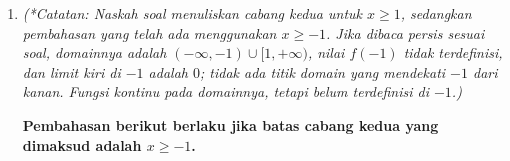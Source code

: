 \documentclass[10pt,openany,a4paper]{article}
\begin{document}
\begin{enumerate}
\begin{enumerate}
            Karena range $R_{f^{-1}}=D_f=(-\infty,1]$, maka $f^{-1}(x)=1-\sqrt{x}$.\\~\\

            \item Salah satu cara menggambar grafik $f^{-1}(x)$ adalah dengan mencerminkan $f(x)$ terhadap garis $y=x$, sehingga akan didapat grafik $f^{-1}(x)$.\\
            \\
            \end{enumerate}
            
            \item \textit{(*Catatan: Naskah soal menuliskan cabang kedua untuk $x\geq1$, sedangkan pembahasan yang telah ada menggunakan $x\geq-1$. Jika dibaca persis sesuai soal, domainnya adalah $(-\infty,-1)\cup[1,+\infty)$, nilai $f(-1)$ tidak terdefinisi, dan limit kiri di $-1$ adalah $0$; tidak ada titik domain yang mendekati $-1$ dari kanan. Fungsi kontinu pada domainnya, tetapi belum terdefinisi di $-1$.)}

        \textbf{Pembahasan berikut berlaku jika batas cabang kedua yang dimaksud adalah $x\geq-1$.}


\end{enumerate}
\end{document}
